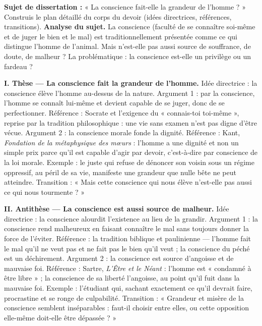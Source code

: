 \documentclass[11pt]{article}
\begin{document}
\begin{exoresolu}
\textbf{Sujet de dissertation :} « La conscience fait-elle la grandeur de l'homme ? » Construis le plan détaillé du corps du devoir (idées directrices, références, transitions).
\tcblower
\textbf{Analyse du sujet.} La conscience (faculté de se connaître soi-même et de juger le bien et le mal) est traditionnellement présentée comme ce qui distingue l'homme de l'animal. Mais n'est-elle pas aussi source de souffrance, de doute, de malheur ? La problématique : la conscience est-elle un privilège ou un fardeau ?

\textbf{I. Thèse — La conscience fait la grandeur de l'homme.}
Idée directrice : la conscience élève l'homme au-dessus de la nature. Argument 1 : par la conscience, l'homme se connaît lui-même et devient capable de se juger, donc de se perfectionner. Référence : Socrate et l'exigence du « connais-toi toi-même », reprise par la tradition philosophique : une vie sans examen n'est pas digne d'être vécue. Argument 2 : la conscience morale fonde la dignité. Référence : Kant, \emph{Fondation de la métaphysique des mœurs} : l'homme a une dignité et non un simple prix parce qu'il est capable d'agir par devoir, c'est-à-dire par conscience de la loi morale. Exemple : le juste qui refuse de dénoncer son voisin sous un régime oppressif, au péril de sa vie, manifeste une grandeur que nulle bête ne peut atteindre. Transition : « Mais cette conscience qui nous élève n'est-elle pas aussi ce qui nous tourmente ? »

\textbf{II. Antithèse — La conscience est aussi source de malheur.}
Idée directrice : la conscience alourdit l'existence au lieu de la grandir. Argument 1 : la conscience rend malheureux en faisant connaître le mal sans toujours donner la force de l'éviter. Référence : la tradition biblique et paulinienne — l'homme fait le mal qu'il ne veut pas et ne fait pas le bien qu'il veut ; la conscience du péché est un déchirement. Argument 2 : la conscience est source d'angoisse et de mauvaise foi. Référence : Sartre, \emph{L'Être et le Néant} : l'homme est « condamné à être libre » ; la conscience de sa liberté l'angoisse, au point qu'il fuit dans la mauvaise foi. Exemple : l'étudiant qui, sachant exactement ce qu'il devrait faire, procrastine et se ronge de culpabilité. Transition : « Grandeur et misère de la conscience semblent inséparables : faut-il choisir entre elles, ou cette opposition elle-même doit-elle être dépassée ? »


\end{exoresolu}
\end{document}
